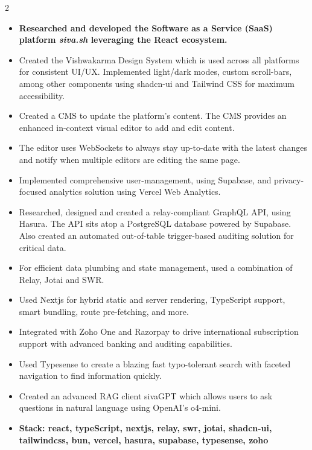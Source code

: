 \documentclass[10pt,a4paper,ragged2e,withhyper]{altacv}
\begin{document}
\tagline{}

\makecvheader
\bigskip


\begin{paracol}{2}


\begin{itemize}
\item \textbf{Researched and developed the Software as a Service (SaaS) platform \textit{siva.sh} leveraging the React ecosystem.}
\item Created the Vishwakarma Design System which is used across all platforms for consistent UI/UX.
      Implemented light/dark modes, custom scroll-bars, among other components using shadcn-ui and Tailwind CSS for maximum accessibility.
\item Created a CMS to update the platform's content. The CMS provides an enhanced in-context visual editor to add and edit content.
\item The editor uses WebSockets to always stay up-to-date with the latest changes and notify when multiple editors are editing the same page.
\item Implemented comprehensive user-management, using Supabase, and privacy-focused analytics solution using Vercel Web Analytics.
\item Researched, designed and created a relay-compliant GraphQL API, using Hasura.
      The API sits atop a PostgreSQL database powered by Supabase.
      Also created an automated out-of-table trigger-based auditing solution for critical data.
\item For efficient data plumbing and state management, used a combination of Relay, Jotai and SWR.
\item Used Nextjs for hybrid static and server rendering, TypeScript support, smart bundling, route pre-fetching, and more.
\item Integrated with Zoho One and Razorpay to drive international subscription support with advanced banking and auditing capabilities.
\item Used Typesense to create a blazing fast typo-tolerant search with faceted navigation to find information quickly.
\item Created an advanced RAG client sivaGPT which allows users to ask questions in natural language using OpenAI's o4-mini.
\item \textbf{Stack: react, typeScript, nextjs, relay, swr, jotai, shadcn-ui, tailwindcss, bun, vercel, hasura, supabase, typesense, zoho}
\end{itemize}


\end{paracol}
\end{document}
